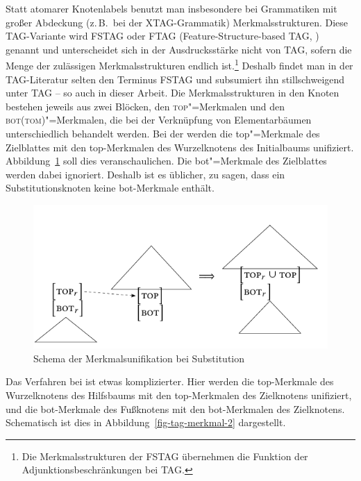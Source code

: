 Statt atomarer Knotenlabels benutzt man insbesondere bei Grammatiken mit großer Abdeckung (z.\,B.\ bei der XTAG-Grammatik) Merkmalsstrukturen. Diese TAG-Variante wird \textsc{FSTAG} oder \textsc{FTAG} (Feature-Structure-based TAG, \citealt{Vijay-Shanker:Joshi:88}) genannt und unterscheidet sich in der Ausdrucksstärke nicht von TAG, sofern die Menge der zulässigen Merkmalsstrukturen endlich ist.\footnote{Die Merkmalsstrukturen der FSTAG übernehmen die Funktion der Adjunktionsbeschränkungen bei TAG.} Deshalb findet man in der TAG-Literatur selten den Terminus FSTAG und subsumiert ihn stillschweigend unter TAG -- so auch in dieser Arbeit. Die Merkmalsstrukturen in den Knoten bestehen jeweils aus zwei Blöcken, den \textsc{top}"=Merkmalen und den  \textsc{bot(tom)}"=Merkmalen, die bei der Verknüpfung von Elementarbäumen unterschiedlich behandelt werden. Bei der  werden die {\sc top}"=Merkmale des Zielblattes mit den {\sc top}-Merkmalen des Wurzelknotens des Initialbaums unifiziert. Abbildung~\ref{fig-tag-merkmal-1} soll dies veranschaulichen. Die {\sc bot}"=Merkmale des Zielblattes werden dabei ignoriert. Deshalb ist es üblicher, zu sagen, dass ein Substitutionsknoten keine {\sc bot}-Merkmale enthält. 
\begin{figure}[t]
\centering
\includegraphics{graphics/abb53.pdf}
\caption{Schema der Merkmalsunifikation bei Substitution\label{fig-tag-merkmal-1}}
\end{figure}    
Das Verfahren bei  ist etwas komplizierter. Hier werden die {\sc top}-Merkmale des Wurzelknotens des Hilfsbaums mit den {\sc top}-Merkmalen des Zielknotens unifiziert, und die {\sc bot}-Merkmale des Fu\ss knotens mit den {\sc bot}-Merkmalen des Zielknotens. Schematisch ist dies in Abbildung~\ref{fig-tag-merkmal-2} dargestellt.
